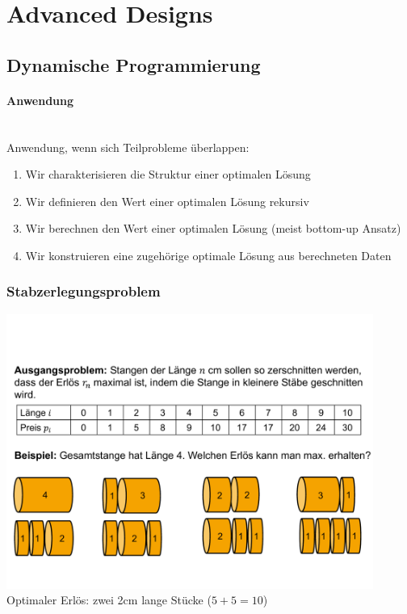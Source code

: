 \documentclass[
    ngerman,
    color=3b,
    dark_mode,
    load_common, %
    summary,
    boxarc,
]{tuda_summary}
\begin{document}
\section{Advanced Designs}
\subsection{Dynamische Programmierung}
\paragraph{Anwendung}\mbox{}\\
Anwendung, wenn sich Teilprobleme überlappen:
\begin{enumerate}
    \item Wir charakterisieren die Struktur einer optimalen Lösung
    \item Wir definieren den Wert einer optimalen Lösung rekursiv
    \item Wir berechnen den Wert einer optimalen Lösung (meist bottom-up Ansatz)
    \item Wir konstruieren eine zugehörige optimale Lösung aus berechneten Daten
\end{enumerate}

\subsubsection{Stabzerlegungsproblem}

\includegraphics[width=12cm]{pictures/stabzerlegungsproblem.pdf}\\
Optimaler Erlös: zwei 2cm lange Stücke ($5+5=10$)\\
\end{document}
